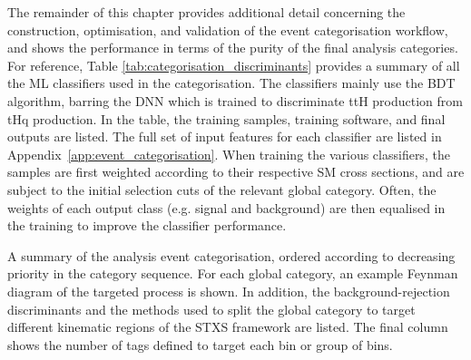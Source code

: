 The remainder of this chapter provides additional detail concerning the construction, optimisation, and validation of the event categorisation workflow, and shows the performance in terms of the purity of the final analysis categories. For reference, Table \ref{tab:categorisation_discriminants} provides a summary of all the ML classifiers used in the categorisation. The classifiers mainly use the BDT algorithm, barring the DNN which is trained to discriminate ttH production from tHq production. In the table, the training samples, training software, and final outputs are listed. The full set of input features for each classifier are listed in Appendix~\ref{app:event_categorisation}. When training the various classifiers, the samples are first weighted according to their respective SM cross sections, and are subject to the initial selection cuts of the relevant global category. Often, the weights of each output class (e.g. signal and background) are then equalised in the training to improve the classifier performance.

\begin{table}
    \caption[Categorisation overview]{A summary of the analysis event categorisation, ordered according to decreasing priority in the category sequence. For each global category, an example Feynman diagram of the targeted process is shown. In addition, the background-rejection discriminants and the methods used to split the global category to target different kinematic regions of the STXS framework are listed. The final column shows the number of tags defined to target each bin or group of bins.}
    \label{tab:categorisation_overview}
    \centering
    \tiny
    \renewcommand{\arraystretch}{1.3}
    \setlength{\tabcolsep}{2pt}
    \hspace*{-3cm}
    
    \hspace*{-3cm}
\end{table}

